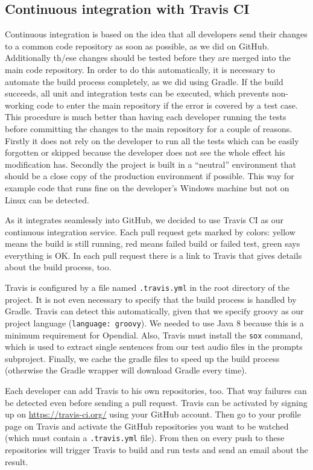 \documentclass[a4paper, 12pt]{article}
\begin{document}
\subsection{Continuous integration with Travis CI}

Continuous integration is based on the idea that all developers send their changes to a common code repository as soon as possible, as we did on GitHub. 
Additionally th/ese changes should be tested before they are merged into the main code repository. 
In order to do this automatically, it is necessary to automate the build process completely, as we did using Gradle.
If the build succeeds, all unit and integration tests can be executed, which prevents non-working code to enter the main repository if the error is covered by a test case.
This procedure is much better than having each developer running the tests before committing the changes to the main repository for a couple of reasons.
Firstly it does not rely on the developer to run all the tests which can be easily forgotten or skipped because the developer does not see the whole effect his modification has.
Secondly the project is built in a “neutral” environment that should be a close copy of the production environment if possible. 
This way for example code that runs fine on the developer's Windows machine but not on Linux can be detected.

As it integrates seamlessly into GitHub, we decided to use Travis CI as our continuous integration service. Each pull request gets marked by colors: yellow means the build is still running, red means failed build or failed test, green says everything is OK. In each pull request there is a link to Travis that gives details about the build process, too.

Travis is configured by a file named \texttt{.travis.yml} in the root directory of the project. 
It is not even necessary to specify that the build process is handled by Gradle.
Travis can detect this automatically, given that we specify groovy as our project language (\texttt{language: groovy}).
We needed to use Java 8 because this is a minimum requirement for Opendial.
Also, Travis must install the \texttt{sox} command, which is used to extract single sentences from our test audio files in the prompts subproject.
Finally, we cache the gradle files to speed up the build process (otherwise the Gradle wrapper will download Gradle every time).

Each developer can add Travis to his own repositories, too.
That way failures can be detected even before sending a pull request.
Travis can be activated by signing up on \url{https://travis-ci.org/} using your GitHub account.
Then go to your profile page on Travis and activate the GitHub repositories you want to be watched (which must contain a \texttt{.travis.yml} file).
From then on every push to these repositories will trigger Travis to build and run tests and send an email about the result.
\end{document}
